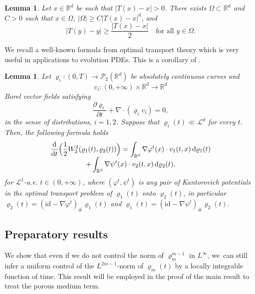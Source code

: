 \documentclass[10pt]{amsart}
\newcommand{\Bprt}[1]{\Bigl(#1\Bigr)}
\newcommand{\curlyL}{\mathcal{L}}
\newcommand{\partialt}[1]{\dfrac{\partial#1}{\partial t}}
\newcommand{\dx}[1]{\mathop{}\!\mathrm{d} #1}
\newcommand{\ddt}{\frac{\dx{}}{\dx{t}}}
\newcommand{\R}{\mathbb{R}}
\theoremstyle{plain}
\newtheorem{lemma}[theorem]{Lemma}
\theoremstyle{remark}
\begin{document}
\begin{lemma}\label{lemma 1}
Let $x\in \R^d$ be such that $|T(x)-x|>0$. There exists $\Omega\subset\R^d$ and $C>0$ such that $x\in \Omega$, $|\Omega|\geq C |T(x)-x|^d$, and
\begin{equation*}
|T(y)-y|\geq \frac{|T(x)-x|}{2} \quad \text{for all } y\in \Omega.
\end{equation*}
\end{lemma}

We recall a well-known formula from optimal transport theory which is very useful in applications to evolution PDEs. This is a corollary of \cite[Th.\,8.4.7]{AGS2008}.
\begin{lemma}
Let $\varrho_i : (0,T)\to\mathcal{P}_2(\R^d)$ be absolutely continuous curves and
\[
v_i: (0,+\infty) \times \R^d \to \R^d
\]
Borel vector fields satisfying
\begin{equation*}
\partialt{\varrho_i} +\nabla\cdot(\varrho_i v_i)=0,
\end{equation*}
in the sense of distributions, $i=1,2$. Suppose that $\varrho_i(t) \ll \curlyL^d$ for every $t$.
Then, the following formula holds
\begin{multline}\label{recall_ dt W_2}
\ddt \Bprt{\frac 12 W_2^2(\varrho_1(t), \varrho_2(t))} = \int_{\R^d} \nabla \varphi^t(x) \cdot v_1(t,x) \dx{\varrho_1(t)}\\[-5pt]
+ \int_{\R^d} \nabla \psi^t(x) \cdot v_2(t,x) \dx{\varrho_2(t)},
\end{multline}
for $\mathcal{L}^1$-a.e. $t\in (0,+\infty)$, where $(\varphi^t,\psi^t)$ is any pair of Kantorovich potentials in the optimal transport problem of $\varrho_1(t)$ onto $\varrho_2(t)$, in particular $\varrho_2(t) = (\mathrm{id} - \nabla\varphi^t)_\#\varrho_1(t)$ and $\varrho_1(t) = (\mathrm{id} - \nabla\psi^t)_\#\varrho_2(t).$
\end{lemma}

\subsection{Preparatory results}

We show that even if we do not control the norm of $\varrho_m^{m-1}$ in $L^\infty$, we~can still infer a uniform control of the $L^{2m-1}$-norm of $\varrho_m(t)$ by a locally integrable function of time. This result will be employed in the proof of the main result to treat the porous medium term.
\end{document}
